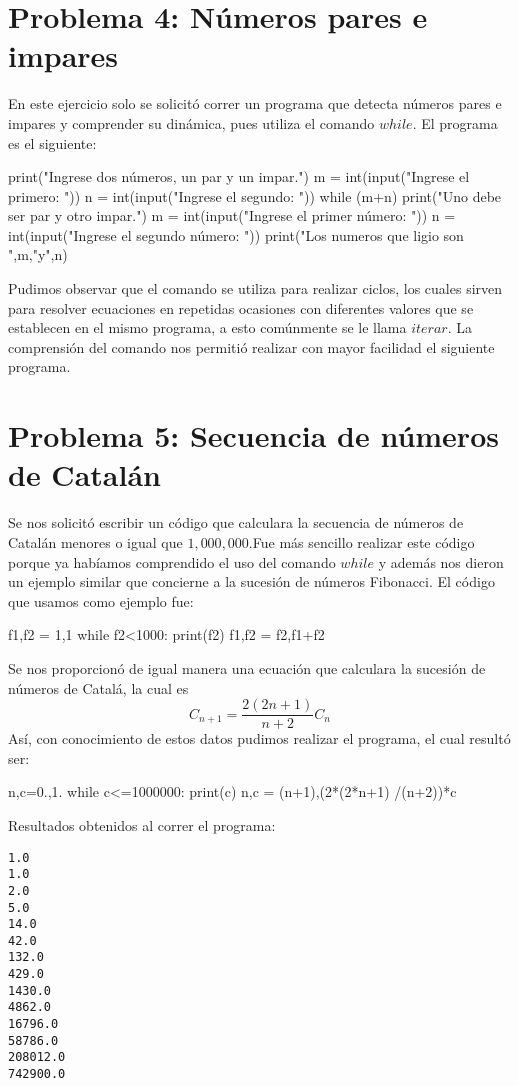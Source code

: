 \documentclass[12 pt,twocolumn]{article}
\begin{document}
\section{\small Problema 4: Números pares e impares}
En este ejercicio solo se solicitó correr un programa que detecta números pares e impares y comprender su dinámica, pues utiliza el comando $while$.
El programa es el siguiente:
\begin{center}
\begin{boxedverbatim}
print("Ingrese dos números, 
un par y un 
impar.")
m = int(input("Ingrese 
el primero: "))
n = int(input("Ingrese
el segundo: "))
while (m+n)%
    print("Uno debe ser 
    par y otro 
    impar.")
    m = int(input("Ingrese
    el primer
    número: "))
    n = int(input("Ingrese
    el segundo 
    número: "))
print("Los numeros que 
ligio son ",m,"y",n)
\end{boxedverbatim}
\end{center}
Pudimos observar que el comando se utiliza para realizar ciclos, los cuales sirven para resolver ecuaciones en repetidas ocasiones con diferentes valores que se establecen en el mismo programa, a esto comúnmente se le llama $iterar$.
La comprensión del comando nos permitió realizar con mayor facilidad el siguiente programa.

\section{\small  Problema 5: Secuencia de números de Catalán}
Se nos solicitó escribir un código que calculara la secuencia de números de Catalán menores o igual que $1,000,000$.Fue más sencillo realizar este código porque ya habíamos comprendido el uso del comando $while$ y además nos dieron un ejemplo similar que concierne a la sucesión de números Fibonacci.
El código que usamos como ejemplo fue:
\begin{center}
\begin{boxedverbatim}
f1,f2 = 1,1
while f2<1000:
      print(f2)
      f1,f2 = f2,f1+f2
\end{boxedverbatim}
\end{center}
Se nos proporcionó de igual manera una ecuación que calculara la sucesión de números de Catalá, la cual es $$C_{n+1}=\frac{2(2n+1)}{n+2}C_n$$
Así, con conocimiento de estos datos pudimos realizar el programa, el cual resultó ser:
\begin{center}
\begin{boxedverbatim}
 n,c=0.,1.
while c<=1000000:
    print(c)
    n,c = (n+1),(2*(2*n+1)
    /(n+2))*c
 \end{boxedverbatim}
 \end{center}
Resultados obtenidos al correr el programa:
\begin{verbatim}
1.0
1.0
2.0
5.0
14.0
42.0
132.0
429.0
1430.0
4862.0
16796.0
58786.0
208012.0
742900.0
\end{verbatim}
\end{document}
